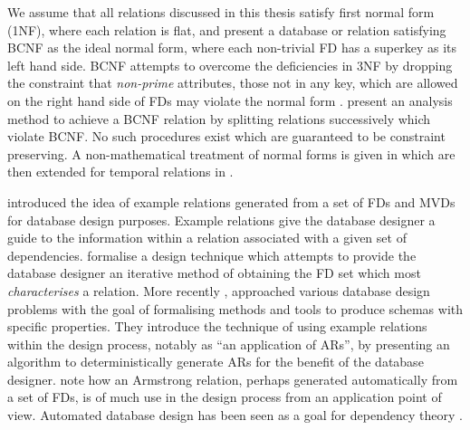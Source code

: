 We assume that all relations discussed in this thesis
satisfy first normal form (1NF), where each relation is flat, and
present a database or relation satisfying BCNF as the ideal normal form,
where each non-trivial FD has a superkey as its left hand side. BCNF
attempts to 
overcome the deficiencies in 3NF by dropping the constraint that {\em
non-prime} attributes, those not in any key, which are allowed on the
right hand side of FDs may violate the normal
form . \cite{bb79}
present an analysis method to achieve a BCNF relation by splitting
relations successively which violate BCNF. No such procedures exist
which 
are guaranteed to be constraint preserving.  A non-mathematical
treatment of normal 
forms is given in \cite{ken83} which are then extended for temporal 
relations in \cite{jss92}. 
\medskip
{}

\cite{sm81} introduced the
idea of example relations generated from a set of FDs and MVDs  for 
database design purposes. Example relations give the database designer 
a guide to the information within a relation associated with a given
set of dependencies. 
\cite{sm81} formalise a design technique which attempts to provide the
database designer an iterative method of obtaining the FD set which
most {\em characterises} a relation.  More recently  \cite{mr86,mr92},
approached various database 
design problems with the goal of formalising methods and tools to
produce schemas with specific properties. They 
introduce the technique of using example relations within the design
process, notably as ``an application of ARs'', by presenting an
algorithm to deterministically generate ARs for the benefit of the
database designer.  \cite{bdfs84} note how an
Armstrong relation, perhaps generated automatically from a set of FDs, is of
much use in the design process from an application point of view.
Automated database design has 
been seen as a goal for dependency theory \cite{bv84}.

\medskip

